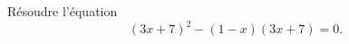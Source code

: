 
\begin{exercice}\label{exosmath-0145}

    Résoudre l'équation
    \begin{equation}
        (3x+7)^2-(1-x)(3x+7)=0.
    \end{equation}

\end{exercice}

